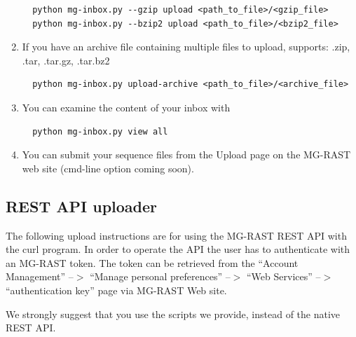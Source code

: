 \documentclass[12pt,fullpage]{report}
\begin{document}
\begin{enumerate}
\begin{small}
\begin{lstlisting}
  python mg-inbox.py --gzip upload <path_to_file>/<gzip_file>
  python mg-inbox.py --bzip2 upload <path_to_file>/<bzip2_file>
\end{lstlisting}
\end{small}
\item If you have an archive file containing multiple files to upload, supports: .zip, .tar, .tar.gz, .tar.bz2
\begin{small}
\begin{lstlisting}
  python mg-inbox.py upload-archive <path_to_file>/<archive_file>
\end{lstlisting}
\end{small}
\item You can examine the content of your inbox with
\begin{small}
\begin{lstlisting}
  python mg-inbox.py view all
\end{lstlisting}
\end{small}

\item You can submit your sequence files from the Upload page on the MG-RAST web site (cmd-line option coming soon).
\end{enumerate}

\subsection*{REST API uploader}

The following upload instructions are for using the MG-RAST REST API with the curl program. In order to operate the API the user has to authenticate with an MG-RAST token. The token can be retrieved from the “Account Management” --$>$ “Manage personal preferences” --$>$ “Web Services” --$>$ “authentication key” page via MG-RAST Web site.

We strongly suggest that you use the scripts we provide, instead of the native REST API.
\end{document}
